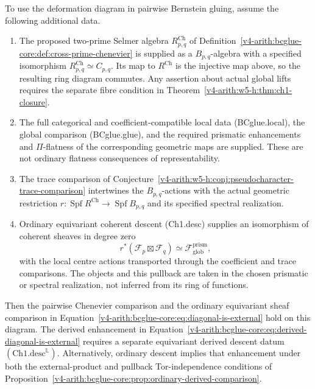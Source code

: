 \begin{corollary}
\label{v4-arith:w5-h:cor:ch1-closes-pairwise}
\ClaimStatusProvedHereConditional
To use the deformation diagram in pairwise Bernstein gluing,
assume the following additional data.
\begin{enumerate}
\item The proposed two-prime Selmer algebra
$R_{p,q}^{\mathrm{Ch}}$ of
Definition~\ref{v4-arith:bcglue-core:def:cross-prime-chenevier} is supplied
as a $B_{p,q}$-algebra with a specified isomorphism
$R_{p,q}^{\mathrm{Ch}}\simeq C_{p,q}$. Its map to $R^{\mathrm{Ch}}$
is the injective map above, so the resulting ring diagram commutes.
Any assertion about actual global lifts requires the separate fibre
condition in Theorem~\ref{v4-arith:w5-h:thm:ch1-closure}.
\item The full categorical and coefficient-compatible local data
(BCglue.local), the global comparison (BCglue.glue), and the
required prismatic enhancements and $\Pi$-flatness of the
corresponding geometric maps are supplied. These are not ordinary
flatness consequences of representability.
\item The trace comparison of
Conjecture~\ref{v4-arith:w5-h:conj:pseudocharacter-trace-comparison}
intertwines the $B_{p,q}$-actions with the actual geometric
restriction $r:\operatorname{Spf}R^{\mathrm{Ch}}\to
\operatorname{Spf}B_{p,q}$ and its specified spectral realization.
\item Ordinary equivariant coherent descent (Ch1.desc) supplies
an isomorphism of coherent sheaves in degree zero
\[
 r^*(\mathcal F_p\boxtimes\mathcal F_q)
       \simeq\mathcal F_{\mathrm{glob}}^{\mathrm{prism}},
\]
with the local centre actions transported through the coefficient
and trace comparisons. The objects and this pullback are taken
in the chosen prismatic or spectral realization, not inferred from
its ring of functions.
\end{enumerate}
Then the pairwise Chenevier comparison and the ordinary equivariant
sheaf comparison in
Equation~\eqref{v4-arith:bcglue-core:eq:diagonal-is-external}
hold on this diagram.
The derived enhancement in
Equation~\eqref{v4-arith:bcglue-core:eq:derived-diagonal-is-external}
requires a separate equivariant derived descent datum
$(\mathrm{Ch1.desc}^{\mathbb L})$.
Alternatively, ordinary descent implies that enhancement under both
the external-product and pullback Tor-independence conditions of
Proposition~\ref{v4-arith:bcglue-core:prop:ordinary-derived-comparison}.
\end{corollary}

